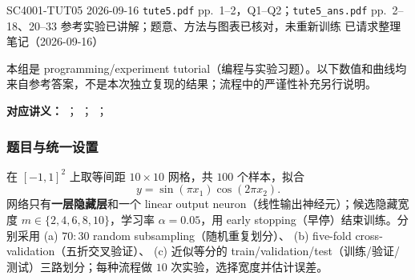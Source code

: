 
\label{tutorial:SC4001-TUT05}

\tutorialmeta
  {SC4001-TUT05}
  {2026-09-16}
  {\texttt{tute5.pdf} pp.~1--2，Q1--Q2；\texttt{tute5\_ans.pdf} pp.~2--18、20--33}
  {参考实验已讲解；题意、方法与图表已核对，未重新训练}
  {已请求整理笔记（2026-09-16）}

本组是 programming/experiment tutorial（编程与实验习题）。以下数值和曲线均来自参考答案，不是本次独立复现的结果；流程中的严谨性补充另行说明。

\nopagebreak[4]

\textbf{对应讲义：}
；
；
；

\subsubsection*{题目与统一设置}

在 $[-1,1]^2$ 上取等间距 $10\times10$ 网格，共 $100$ 个样本，拟合
\[
  y=\sin(\pi x_1)\cos(2\pi x_2).
\]
网络只有\textbf{一层隐藏层}和一个 linear output neuron（线性输出神经元）；候选隐藏宽度
$m\in\{2,4,6,8,10\}$，学习率 $\alpha=0.05$，用 early stopping（早停）结束训练。分别采用
(a) $70{:}30$ random subsampling（随机重复划分）、
(b) five-fold cross-validation（五折交叉验证）、
(c) 近似等分的 train/validation/test（训练/验证/测试）三路划分；每种流程做 $10$ 次实验，选择宽度并估计误差。

